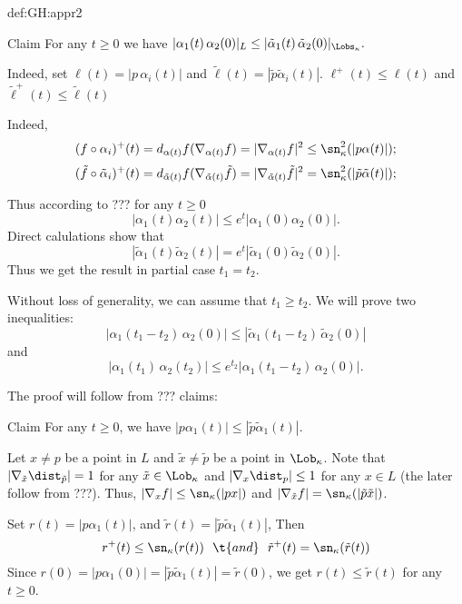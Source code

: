 {\begin{subthm}{def:GH:appr2}
\begin{thm}{Claim}
For any $t\ge 0$ we have
$|\alpha_1(t)\,\alpha_2(0)|_L\le |\tilde \alpha_1(t)\,\tilde \alpha_2(0)|_{\Lobs_\kappa}.$
\end{thm}

Indeed, set $\ell(t)=|p\,\alpha_i(t)|$ and $\tilde \ell(t)=|\tilde p\tilde \alpha_i(t)|$.
$\ell^+(t)\le\ell(t)$ and $\tilde \ell^+(t)\le\tilde \ell(t)$

Indeed, 
$$(f\circ\alpha_i)^+(t)=d_{\alpha(t)}f(\nabla_{\alpha(t)}f)=|\nabla_{\alpha(t)}f|^2\le\sn_\kappa^2(|p\alpha(t)|);$$
$$(\tilde f\circ\tilde \alpha_i)^+(t)=d_{\tilde \alpha(t)}f(\nabla_{\tilde \alpha(t)}\tilde f)=|\nabla_{\tilde \alpha(t)}\tilde f|^2=\sn_\kappa^2(|\tilde p\tilde \alpha(t)|);$$

Thus according to ??? for any $t\ge 0$
$$|\alpha_1(t)\alpha_2(t)|\le e^t|\alpha_1(0)\alpha_2(0)|.$$
Direct calulations show that 
$$|\tilde \alpha_1(t)\tilde \alpha_2(t)|= e^t|\tilde \alpha_1(0)\tilde \alpha_2(0)|.$$
Thus we get the result in partial case $t_1=t_2$.

Without loss of generality, we can assume that $t_1\ge t_2$.
We will prove two inequalities:
$$|\alpha_1(t_1-t_2)\,\alpha_2(0)|\le |\tilde \alpha_1(t_1-t_2)\,\tilde \alpha_2(0)|$$
and 
$$|\alpha_1(t_1)\,\alpha_2(t_2)|\le e^{t_2}|\alpha_1(t_1-t_2)\,\alpha_2(0)|.$$






















The proof will follow from ??? claims:

\begin{thm}{Claim} For any $t\ge 0$, we have
$|p\alpha_1(t)|\le |\tilde p\tilde \alpha_1(t)|$.
\end{thm}

Let $x\not=p$     be a point in $L$ 
and $\tilde x\not=\tilde p$ be a point in $\Lob_\kappa$.
Note that
$|\nabla_{\tilde x}\dist_{\tilde p}|=1$ for any $\tilde x\in\Lob_\kappa$ and 
$|\nabla_x\dist_p|\le1$       for any $x\in L$
(the later follow from ???).
Thus, $|\nabla_xf|\le \sn_\kappa(|px|)$ and $|\nabla_{\tilde x}f|= \sn_\kappa(|\tilde p\tilde x|)$.

Set $r(t)=|p\alpha_1(t)|$, and $\tilde r(t)=|\tilde p\tilde \alpha_1(t)|$, 
Then 
$$r^+(t)\le \sn_\kappa(r(t))\ \ \t{and}\ \ \tilde r^+(t)= \sn_\kappa(\tilde r(t))$$
Since $r(0)=|p\alpha_1(0)|=|\tilde p\tilde \alpha_1(t)|=\tilde r(0)$, we get $r(t)\le \tilde r(t)$ for any $t\ge 0$.\qeds

























\end{subthm}}
